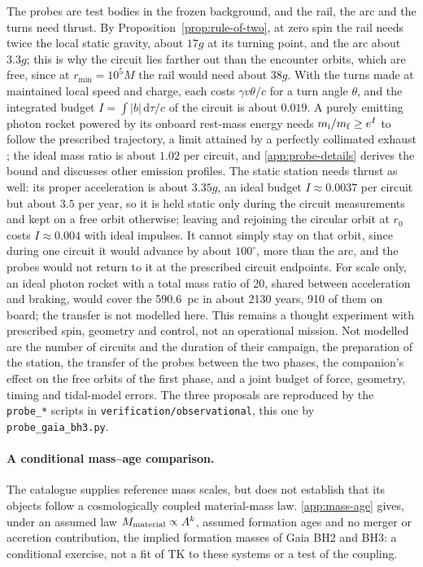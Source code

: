\documentclass[12pt]{iopart}
\theoremstyle{plain}
\theoremstyle{definition}
\theoremstyle{remark}
\newcommand{\dd}{\mathrm{d}}
\begin{document}
The probes are test bodies in the frozen background, and the rail, the arc and the turns
need thrust. By Proposition~\ref{prop:rule-of-two}, at zero spin the rail needs twice the
local static gravity, about $17g$ at its turning point, and the arc about $3.3g$; this is why
the circuit lies farther out than the encounter orbits, which are free, since at
$r_{\min}=10^5M$ the rail would need about $38g$. With the
turns made at maintained local speed and charge, each costs $\gamma v\theta/c$ for a turn
angle $\theta$, and the integrated budget $I=\int|b|\,\dd\tau/c$ of the circuit is about
$0.019$. A purely emitting photon rocket powered by its onboard rest-mass energy needs
$m_{\rm i}/m_{\rm f}\ge e^{I}$ to follow the prescribed trajectory, a limit attained by a
perfectly collimated exhaust \cite{Fuzfa2019}; the ideal mass ratio is about $1.02$ per
circuit, and \ref{app:probe-details} derives the bound and discusses other emission
profiles. The static station needs thrust as well:
its proper acceleration is about $3.35g$, an ideal budget $I\approx0.0037$ per circuit but
about $3.5$ per year, so it is held static only during the circuit measurements and kept on a
free orbit otherwise; leaving and rejoining the circular orbit at $r_0$ costs $I\approx0.004$ with ideal
impulses. It cannot simply stay on that orbit, since during one circuit it would advance
by about $100^\circ$, more than the arc, and the probes would not return to it at the
prescribed circuit endpoints. For scale only,
an ideal photon rocket with a total mass ratio of 20, shared between acceleration and
braking, would cover the 590.6~pc in about 2130 years, 910 of them on board; the transfer is
not modelled here. This remains a thought experiment with prescribed spin, geometry and
control, not an operational mission. Not modelled are the number of circuits and the duration
of their campaign, the preparation of the station, the transfer of the probes between the two
phases, the companion's effect on the free orbits of the first phase, and a joint budget of
force, geometry, timing and tidal-model errors. The three proposals are reproduced by the
\texttt{probe\_*} scripts in \texttt{verification/observational}, this one by
\texttt{probe\_gaia\_bh3.py}.

\paragraph{A conditional mass--age comparison.}
The catalogue supplies reference mass scales, but does not establish
that its objects follow a cosmologically coupled material-mass law.
\ref{app:mass-age} gives, under an assumed law $M_{\rm material}\propto A^k$, assumed
formation ages and no merger or accretion contribution, the implied formation masses of
Gaia BH2 and BH3: a conditional exercise, not a fit of TK to these systems or a test of
the coupling.
\end{document}

